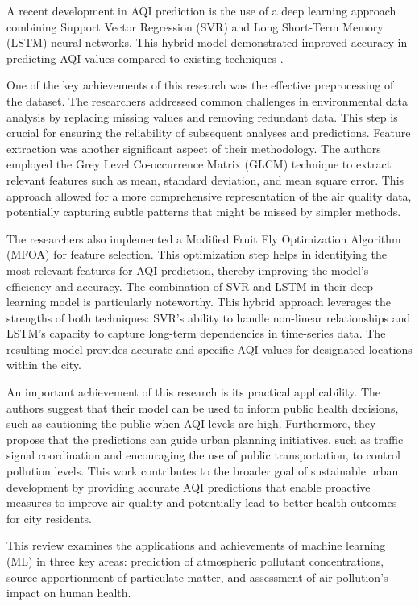 \documentclass{book}
\numberwithin{equation}{section}
\numberwithin{figure}{section}
\begin{document}
A recent development in AQI prediction is the use of a deep learning approach combining Support Vector Regression (SVR) and Long Short-Term Memory (LSTM) neural networks. This hybrid model demonstrated improved accuracy in predicting AQI values compared to existing techniques \citep{janarthanan2021deep}.

One of the key achievements of this research was the effective preprocessing of the dataset. The researchers addressed common challenges in environmental data analysis by replacing missing values and removing redundant data. This step is crucial for ensuring the reliability of subsequent analyses and predictions. Feature extraction was another significant aspect of their methodology. The authors employed the Grey Level Co-occurrence Matrix (GLCM) technique to extract relevant features such as mean, standard deviation, and mean square error. This approach allowed for a more comprehensive representation of the air quality data, potentially capturing subtle patterns that might be missed by simpler methods.

The researchers also implemented a Modified Fruit Fly Optimization Algorithm (MFOA) for feature selection. This optimization step helps in identifying the most relevant features for AQI prediction, thereby improving the model's efficiency and accuracy. The combination of SVR and LSTM in their deep learning model is particularly noteworthy. This hybrid approach leverages the strengths of both techniques: SVR's ability to handle non-linear relationships and LSTM's capacity to capture long-term dependencies in time-series data. The resulting model provides accurate and specific AQI values for designated locations within the city.

An important achievement of this research is its practical applicability. The authors suggest that their model can be used to inform public health decisions, such as cautioning the public when AQI levels are high. Furthermore, they propose that the predictions can guide urban planning initiatives, such as traffic signal coordination and encouraging the use of public transportation, to control pollution levels. This work contributes to the broader goal of sustainable urban development by providing accurate AQI predictions that enable proactive measures to improve air quality and potentially lead to better health outcomes for city residents.

This review examines the applications and achievements of machine learning (ML) in three key areas: prediction of atmospheric pollutant concentrations, source apportionment of particulate matter, and assessment of air pollution's impact on human health.
\end{document}
